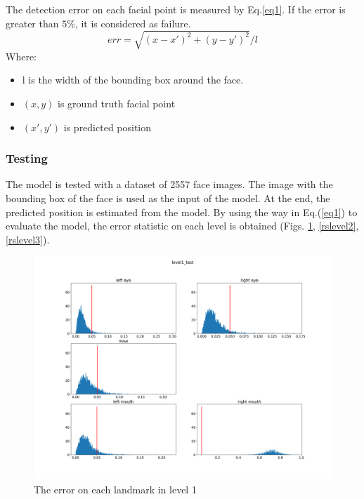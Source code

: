 \documentclass[12pt,a4paper]{article}
\begin{document}
The detection error on each facial point is measured by Eq.\ref{eq1}. If the error is greater than $5\%$, it is considered as failure.
\begin{equation}
	err = \sqrt{(x-x')^2 + (y-y')^2}/l
	\label{eq1}
\end{equation}
Where:
\begin{itemize}
	\item l is the width of the bounding box around the face.
	\item $(x,y)$ is ground truth facial point
	\item $(x',y')$ is predicted position
\end{itemize}
\subsubsection{Testing}
The model is tested with a dataset of 2557 face images. The image with the bounding box of the face is used as the input of the model. At the end, the predicted position is estimated from the model. By using the way in Eq.(\ref{eq1}) to evaluate the model, the error statistic on each level is obtained (Figs. \ref{rslevel1}, \ref{rslevel2}, \ref{rslevel3}).
\begin{figure}[!h]
	\centering
	\includegraphics[scale=0.3]{images/level1_test}
	\caption{The error on each landmark in level 1}
	\label{rslevel1}
\end{figure}
\end{document}
